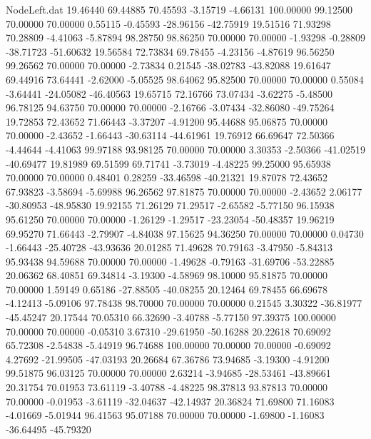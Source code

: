 \begin{filecontents}{NodeLeft.dat}
  19.46440   69.44885   70.45593    -3.15719   -4.66131  100.00000   99.12500   70.00000   70.00000    0.55115   -0.45593  -28.96156  -42.75919
  19.51516   71.93298   70.28809    -4.41063   -5.87894   98.28750   98.86250   70.00000   70.00000   -1.93298   -0.28809  -38.71723  -51.60632
  19.56584   72.73834   69.78455    -4.23156   -4.87619   96.56250   99.26562   70.00000   70.00000   -2.73834    0.21545  -38.02783  -43.82088
  19.61647   69.44916   73.64441    -2.62000   -5.05525   98.64062   95.82500   70.00000   70.00000    0.55084   -3.64441  -24.05082  -46.40563
  19.65715   72.16766   73.07434    -3.62275   -5.48500   96.78125   94.63750   70.00000   70.00000   -2.16766   -3.07434  -32.86080  -49.75264
  19.72853   72.43652   71.66443    -3.37207   -4.91200   95.44688   95.06875   70.00000   70.00000   -2.43652   -1.66443  -30.63114  -44.61961
  19.76912   66.69647   72.50366    -4.44644   -4.41063   99.97188   93.98125   70.00000   70.00000    3.30353   -2.50366  -41.02519  -40.69477
  19.81989   69.51599   69.71741    -3.73019   -4.48225   99.25000   95.65938   70.00000   70.00000    0.48401    0.28259  -33.46598  -40.21321
  19.87078   72.43652   67.93823    -3.58694   -5.69988   96.26562   97.81875   70.00000   70.00000   -2.43652    2.06177  -30.80953  -48.95830
  19.92155   71.26129   71.29517    -2.65582   -5.77150   96.15938   95.61250   70.00000   70.00000   -1.26129   -1.29517  -23.23054  -50.48357
  19.96219   69.95270   71.66443    -2.79907   -4.84038   97.15625   94.36250   70.00000   70.00000    0.04730   -1.66443  -25.40728  -43.93636
  20.01285   71.49628   70.79163    -3.47950   -5.84313   95.93438   94.59688   70.00000   70.00000   -1.49628   -0.79163  -31.69706  -53.22885
  20.06362   68.40851   69.34814    -3.19300   -4.58969   98.10000   95.81875   70.00000   70.00000    1.59149    0.65186  -27.88505  -40.08255
  20.12464   69.78455   66.69678    -4.12413   -5.09106   97.78438   98.70000   70.00000   70.00000    0.21545    3.30322  -36.81977  -45.45247
  20.17544   70.05310   66.32690    -3.40788   -5.77150   97.39375  100.00000   70.00000   70.00000   -0.05310    3.67310  -29.61950  -50.16288
  20.22618   70.69092   65.72308    -2.54838   -5.44919   96.74688  100.00000   70.00000   70.00000   -0.69092    4.27692  -21.99505  -47.03193
  20.26684   67.36786   73.94685    -3.19300   -4.91200   99.51875   96.03125   70.00000   70.00000    2.63214   -3.94685  -28.53461  -43.89661
  20.31754   70.01953   73.61119    -3.40788   -4.48225   98.37813   93.87813   70.00000   70.00000   -0.01953   -3.61119  -32.04637  -42.14937
  20.36824   71.69800   71.16083    -4.01669   -5.01944   96.41563   95.07188   70.00000   70.00000   -1.69800   -1.16083  -36.64495  -45.79320

\end{filecontents}
